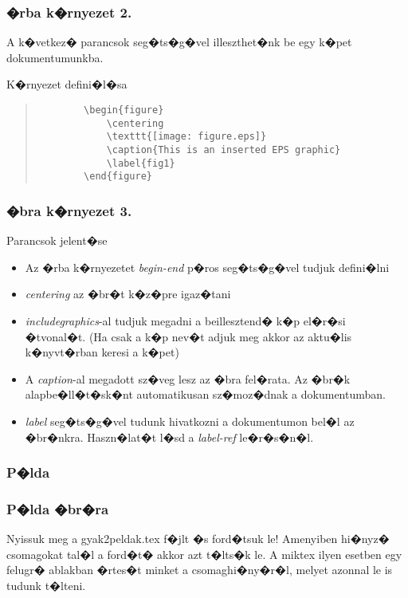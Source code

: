 \documentclass[xcolor=pdftex,dvipsnames,table,compress,bigger]{beamer}
\begin{document}
\begin{frame}[fragile]
	\frametitle{�rba k�rnyezet 2.}
	A k�vetkez� parancsok seg�ts�g�vel illeszthet�nk be egy k�pet dokumentumunkba.
	\begin{block}{K�rnyezet defini�l�sa}
		    \begin{quote}
    \begin{verbatim}
		\begin{figure}
			\centering
			\texttt{[image: figure.eps]}
			\caption{This is an inserted EPS graphic}
			\label{fig1}
		\end{figure}
    \end{verbatim}
    \end{quote}
	\end{block}
\end{frame}

\begin{frame}
	\frametitle{�bra k�rnyezet 3.}

	\begin{block}{Parancsok jelent�se}
		\begin{itemize}
			\item Az �rba k�rnyezetet \textit{begin-end} p�ros seg�ts�g�vel tudjuk defini�lni
			\item \textit{centering} az �br�t k�z�pre igaz�tani
			\item \textit{includegraphics}-al tudjuk megadni a beillesztend� k�p el�r�si �tvonal�t. (Ha csak a k�p nev�t adjuk meg akkor az aktu�lis k�nyvt�rban keresi a k�pet)
			\item A \textit{caption}-al megadott sz�veg lesz az �bra fel�rata. Az �br�k alapbe�ll�t�sk�nt automatikusan sz�moz�dnak a dokumentumban.
			\item \textit{label} seg�ts�g�vel tudunk hivatkozni a dokumentumon bel�l az �br�nkra. Haszn�lat�t l�sd a \textit{label-ref} le�r�s�n�l.
		\end{itemize}
	\end{block}
\end{frame}

\subsubsection{P�lda}
\begin{frame}
	\frametitle{P�lda �br�ra}
Nyissuk meg a gyak2peldak.tex f�jlt �s ford�tsuk le! Amenyiben hi�nyz� csomagokat tal�l a ford�t� akkor azt t�lts�k le. A miktex ilyen esetben egy felugr� ablakban �rtes�t minket a csomaghi�ny�r�l, melyet azonnal le is tudunk t�lteni.
\end{frame}
\end{document}
